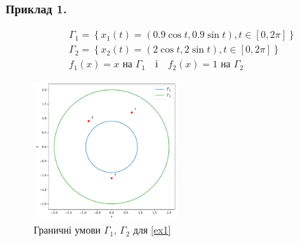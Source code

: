 \documentclass{beamer}
\numberwithin{equation}{section}
\begin{document}
	\begin{frame}
		\frametitle{Приклад 1.}
				
					
		
		{\small{
		\begin{equation}
			\label{ex1}
			\begin{array}{l}
				\displaystyle
				\Gamma_{1}=\left\{x_{1}(t)=(0.9 \cos t, 0.9 \sin t), t \in[0,2 
				\pi]\right\} \\
				
				\displaystyle
				\Gamma_{2}=\left\{x_{2}(t)=(2 \cos t, 2 \sin t), t \in[0,2 \pi]\right\} \\[0.1cm]

				\displaystyle
				f_{1}(x)=x  \text { на } \Gamma_{1} \quad \text {і} \quad
				f_{2}(x)=1  \text { на } \Gamma_{2}
			\end{array}
		\end{equation}
		}}
				
		\begin{figure}
			\includegraphics[width=0.48\textwidth]{resources/curves_and_points.pdf}
			\caption{Граничні умови $\Gamma_1$, $\Gamma_2$ для \ref{ex1}}
		\end{figure}
		
	\end{frame}
\end{document}

